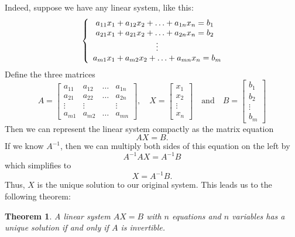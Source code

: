 \documentclass[10pt]{article}
\newtheorem{theorem}{Theorem}
\theoremstyle{definition}
\begin{document}
Indeed, suppose we have any linear system, like this:
\begin{equation*}
  \left\{ \begin{array}{l@{}l}
      \ a_{11}x_{1}+a_{12}x_{2}+\ldots+a_{1n}x_{n} = b_{1} \\
      \ a_{21}x_{1}+a_{21}x_{2}+\ldots+a_{2n}x_{n} = b_{2} \\
      \hfill\vdots\hfill \\
      a_{m1}x_{1}+a_{m2}x_{2}+\ldots+a_{mn}x_{n} = b_{m}
    \end{array}\right.
\end{equation*}
Define the three matrices
\begin{equation*}
  A =
  \begin{bmatrix}
    a_{11}&a_{12}&\ldots& a_{1n}\\
    a_{21}&a_{22}&\ldots& a_{2n}\\
    \vdots&\vdots & &\vdots \\
    a_{m1}&a_{m2}&\ldots& a_{mn}
  \end{bmatrix},
  \quad
  X =
  \begin{bmatrix}
    x_{1}\\x_{2}\\\vdots\\x_{n}
  \end{bmatrix}
  \quad \text{and} \quad
  B =
  \begin{bmatrix}
    b_{1}\\b_{2}\\\vdots\\b_{m}
  \end{bmatrix}
\end{equation*}
Then we can represent the linear system compactly as the matrix equation
\begin{equation*}
  AX=B.
\end{equation*}
If we know $A^{-1}$, then we can multiply both sides of this equation on the
left by
\begin{equation*}
  A^{-1}AX = A^{-1}B
\end{equation*}
which simplifies to
\begin{equation}\label{eq:inverse-solution-to-linear-equation}
  X = A^{-1}B.
\end{equation}
Thus, $X$ is the unique solution to our original system. This leads us to the
following theorem:
\begin{theorem}
  \label{thm:unique-solution-invertibility}
  A linear system $AX=B$ with $n$ equations and $n$ variables has a unique
  solution if and only if $A$ is invertible.
\end{theorem}
\end{document}
